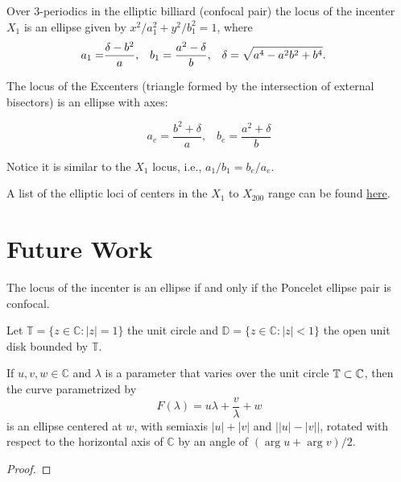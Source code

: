 \begin{theorem}
Over 3-periodics in the elliptic billiard (confocal pair) the locus of the incenter $X_1$ is an ellipse given by 
$x^2/a_1^2+y^2/b_1^2=1$, where
	\begin{equation*}\label{eq:Eint}\aligned
	a_1 =& \frac{\delta-b^2 }{a},\;\;\;
	b_1  =   \frac{a^2-\delta}{b},\;\;\; \delta=\sqrt{a^4-a^2b^2+b^4}.
	\endaligned
	\end{equation*}
	
	The locus of the Excenters (triangle formed by the intersection of external bisectors) is an ellipse with axes:
 
\begin{equation*}
 a_e=\frac{{b}^{2}+\delta}{a},\;\;\; 
 b_e=\frac{{a}^{2}+\delta}{b}
\end{equation*}
 
\noindent Notice it is similar to the $X_1$ locus, i.e., $a_1/b_1=b_e/a_e$.
\end{theorem}

A list of the elliptic loci of centers in the $X_{1}$ to $X_{200}$ range can be found \href{https://dan-reznik.github.io/why-so-many-ellipses/}{here}.

\section{Future Work}

\begin{conjecture}
The locus of the incenter is an ellipse if and only if the Poncelet ellipse pair is confocal.
\end{conjecture}

Let  $\mathbb{T } = \{ z\in \mathbb{C}: |z| = 1\} $ the unit circle and $\mathbb{D} = \{ z\in\mathbb{C} : |z| < 1\} $ the open unit disk
bounded by $\mathbb{T }.$

\begin{lemma}
If $u,v,w\in\mathbb{C}$ and $\lambda$ is a parameter that varies over the unit circle $\mathbb{T}\subset\mathbb{C}$, then the curve parametrized by
\[ F(\lambda)=u \lambda+ \frac{v}{\lambda}+w \]
is an ellipse centered at $w$, with semiaxis $|u|+|v|$ and $\big||u|-|v|\big|$, rotated with respect to the horizontal axis of $\mathbb{C}$ by an angle of $(\arg u+\arg v)/2$.
\label{lem:ell-param}
\end{lemma}
\begin{proof}

\end{proof}



